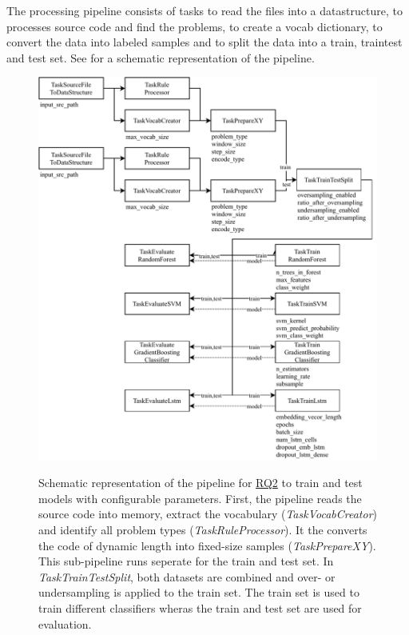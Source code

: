 The processing pipeline consists of tasks to read the files into a datastructure, to processes source code and find the problems, to create a vocab dictionary, to convert the data into labeled samples and to split the data into a train, traintest and test set. See  for a schematic representation of the pipeline.

\begin{figure}
    \includegraphics[width=1\textwidth]{img/ML/Pipeline_RQ2.pdf}
    \label{fig:pipeline_rq2}
    \caption[Schematic representation of the pipeline to train and test models.]{Schematic representation of the pipeline for \hyperref[rq:2]{RQ2} to train and test models with configurable parameters. First, the pipeline reads the source code into memory, extract the vocabulary (\textit{TaskVocabCreator}) and identify all problem types (\textit{TaskRuleProcessor}). It the converts the code of dynamic length into fixed-size samples (\textit{TaskPrepareXY}). This sub-pipeline runs seperate for the train and test set. In \textit{TaskTrainTestSplit}, both datasets are combined and over- or undersampling is applied to the train set. The train set is used to train different classifiers wheras the train and test set are used for evaluation.}
\end{figure}


